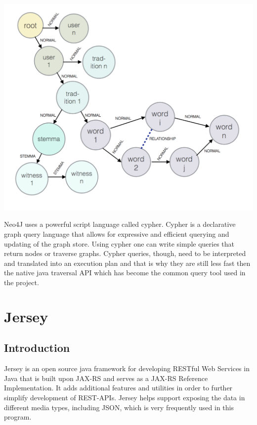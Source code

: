 \documentclass[11pt,fleqn,openany]{book} %
\begin{document}
\begin{center}
\includegraphics[scale=.5]{Pictures/database.png} 
\end{center} 
Neo4J uses a powerful script language called cypher. Cypher is a declarative graph query language that allows for expressive and efficient querying and updating of the graph store. Using cypher one can write simple queries that return nodes or traverse graphs. Cypher queries, though, need to be interpreted and translated into an execution plan and that is why they are still less fast then the native java traversal API which has become the common query tool used in the project.



\chapter{Jersey}

\section*{Introduction}
Jersey is an open source java framework for developing RESTful Web Services in Java that is built upon JAX-RS and serves as a JAX-RS Reference Implementation. It adds additional features and utilities in order to further simplify development of REST-APIs. Jersey helps support exposing the data in different media types, including JSON, which is very frequently used in this program. 
\end{document}
